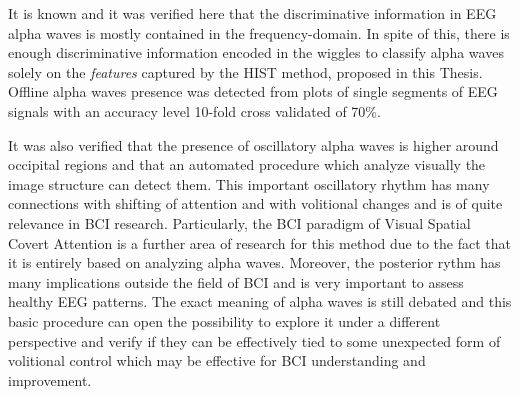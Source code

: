 It is known and it was verified here that the discriminative information in EEG alpha waves is mostly contained in the frequency-domain.  In spite of this,  there is enough discriminative information encoded in the wiggles to classify alpha waves solely on the \textit{features} captured by the HIST method, proposed in this Thesis.  Offline alpha waves presence was detected from plots of single segments of EEG signals with an accuracy level 10-fold cross validated of 70\%.

It was also verified that the presence of oscillatory alpha waves is higher around occipital regions and that an automated procedure which analyze visually the image structure can detect them. This important oscillatory rhythm has many connections with shifting of attention and with volitional changes and is of quite relevance in BCI research.  Particularly, the BCI paradigm of Visual Spatial Covert Attention is a further area of research for this method due to the fact that it is entirely based on analyzing alpha waves. Moreover, the posterior rythm has many implications outside the field of BCI and is very important to assess healthy EEG patterns. The exact meaning of alpha waves is still debated\cite{Ahn2013} and this basic procedure can open the possibility to explore it under a different perspective and verify if they can be effectively tied to some unexpected form of volitional control which may be effective for BCI understanding and improvement.

%





